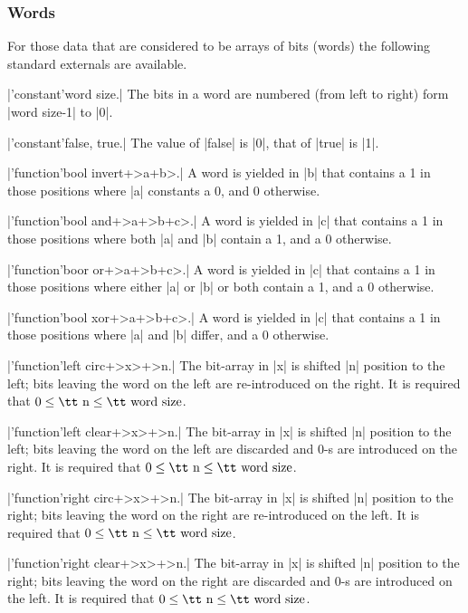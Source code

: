 \documentclass{article}
\begin{document}
\subsubsection{Words}\label{5.2.2}

For those data that are considered to be arrays of bits (words) the
following standard externals are available.

\X\pp|'constant'word size.|\Y
The bits in a word are numbered (from left to right) form \pp|word size-1|
to \pp|0|.

\X\pp|'constant'false, true.|\Y
The value of \pp|false| is \pp|0|, that of \pp|true| is \pp|1|.

\X\pp|'function'bool invert+>a+b>.|\Y
A word is yielded in \pp|b| that contains a 1 in those positions where
\pp|a| constants a 0, and 0 otherwise.

\X\pp|'function'bool and+>a+>b+c>.|\Y
A word is yielded in \pp|c| that contains a 1 in those positions where both
\pp|a| and \pp|b| contain a 1, and a 0 otherwise.

\X\pp|'function'boor or+>a+>b+c>.|\Y
A word is yielded in \pp|c| that contains a 1 in those positions where
either \pp|a| or \pp|b| or both contain a 1, and a 0 otherwise.

\X\pp|'function'bool xor+>a+>b+c>.|\Y
A word is yielded in \pp|c| that contains a 1 in those positions where
\pp|a| and \pp|b| differ, and a 0 otherwise.

\smallskip

\X\pp|'function'left circ+>x>+>n.|\Y
The bit-array in \pp|x| is shifted \pp|n| position to the left; bits leaving
the word on the left are re-introduced on the right. It is required that
$0\le\mbox{\tt n}\le\mbox{\tt word size}$.

\X\pp|'function'left clear+>x>+>n.|\Y
The bit-array in \pp|x| is shifted \pp|n| position to the left; bits leaving
the word on the left are discarded and 0-s are introduced on the right. It is
required that $0\le\mbox{\tt n}\le\mbox{\tt word size}$.

\X\pp|'function'right circ+>x>+>n.|\Y
The bit-array in \pp|x| is shifted \pp|n| position to the right; bits leaving
the word on the right are re-introduced on the left. It is required that
$0\le\mbox{\tt n}\le\mbox{\tt word size}$.

\X\pp|'function'right clear+>x>+>n.|\Y
The bit-array in \pp|x| is shifted \pp|n| position to the right; bits leaving
the word on the right are discarded and 0-s are introduced on the left. It is
required that $0\le\mbox{\tt n}\le\mbox{\tt word size}$.
\end{document}
